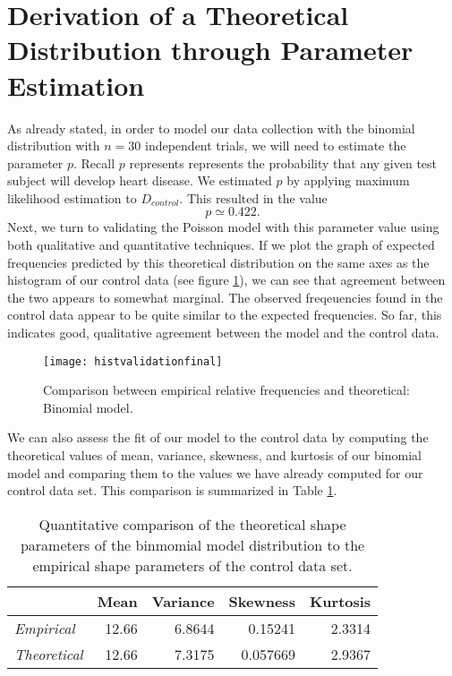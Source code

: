\documentclass{amsart}
\begin{document}
\section{Derivation of a Theoretical Distribution through Parameter Estimation}
As already stated, in order to model our data collection with the binomial distribution with $n=30$ independent trials, we will need to estimate the parameter $p$. Recall $p$ represents represents the probability that any given test subject will develop heart disease. We estimated $p$ by applying maximum likelihood estimation to $D_{control}$. This resulted in the value
\[
p\simeq 0.422.
\]
Next, we turn to validating the Poisson model with this parameter value using both qualitative and quantitative techniques. If we plot the graph of expected frequencies predicted by this theoretical distribution on the same axes as the histogram of our control data (see figure \ref{F:graphicalAssessement}), we can see that agreement between the two appears to somewhat marginal. The observed freqeuencies found in the control data appear to be quite similar to the expected frequencies. So far, this indicates good, qualitative agreement between the model and the control data.
\begin{figure}
\centering
\texttt{[image: histvalidationfinal]}
\caption{
Comparison between empirical relative frequencies and theoretical: Binomial model.\label{F:graphicalAssessement}}
\end{figure}
We can also assess the fit of our model to the control data by computing the theoretical values of mean, variance, skewness, and kurtosis of our binomial model and comparing them to the values we have already computed for our control data set. This comparison is summarized in Table \ref{Tbl:quantitativeAssessment}.
\begin{table}
\begin{tabular}{lrrrr}
\toprule
			&	{\bf Mean}	&	{\bf Variance}	&	{\bf Skewness}	&	{\bf Kurtosis}\\\midrule
{\sl Empirical}	&	12.66	&	6.8644	&	0.15241	&	2.3314\\ 
{\sl Theoretical}&	12.66   &	7.3175	&	0.057669		&	2.9367\\
\bottomrule
\end{tabular}
 \caption{Quantitative comparison of the theoretical shape parameters of the binmomial model distribution to the empirical shape parameters of the control data set.\label{Tbl:quantitativeAssessment}}
\end{table}
\end{document}
